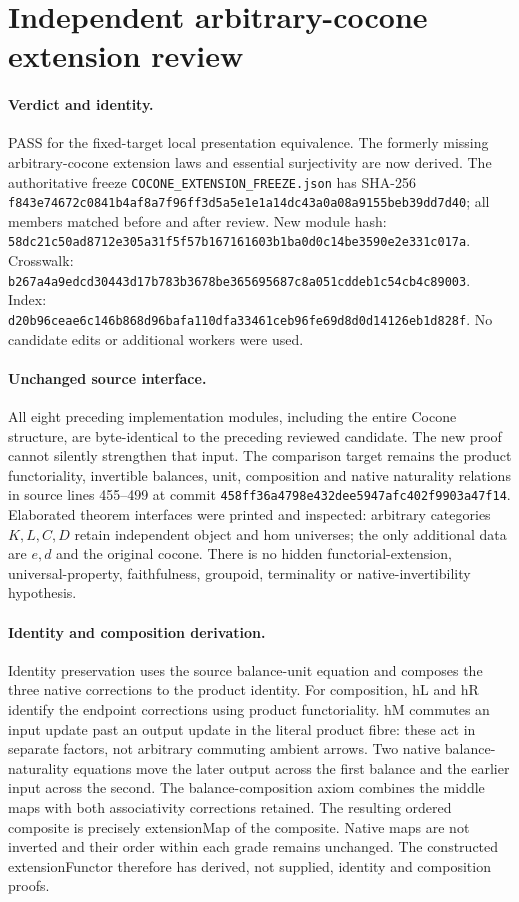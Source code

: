 \documentclass{article}
\begin{document}
\section*{Independent arbitrary-cocone extension review}
\paragraph{Verdict and identity.} PASS for the fixed-target local presentation equivalence. The formerly missing arbitrary-cocone extension laws and essential surjectivity are now derived. The authoritative freeze \texttt{COCONE\_EXTENSION\_FREEZE.json} has SHA-256 \texttt{f843e74672c0841b4af8a7f96ff3d5a5e1e1a14dc43a0a08a9155beb39dd7d40}; all members matched before and after review. New module hash: \texttt{58dc21c50ad8712e305a31f5f57b167161603b1ba0d0c14be3590e2e331c017a}. Crosswalk: \texttt{b267a4a9edcd30443d17b783b3678be365695687c8a051cddeb1c54cb4c89003}. Index: \texttt{d20b96ceae6c146b868d96bafa110dfa33461ceb96fe69d8d0d14126eb1d828f}. No candidate edits or additional workers were used.
\paragraph{Unchanged source interface.} All eight preceding implementation modules, including the entire Cocone structure, are byte-identical to the preceding reviewed candidate. The new proof cannot silently strengthen that input. The comparison target remains the product functoriality, invertible balances, unit, composition and native naturality relations in source lines 455--499 at commit \texttt{458ff36a4798e432dee5947afc402f9903a47f14}. Elaborated theorem interfaces were printed and inspected: arbitrary categories $K,L,C,D$ retain independent object and hom universes; the only additional data are $e,d$ and the original cocone. There is no hidden functorial-extension, universal-property, faithfulness, groupoid, terminality or native-invertibility hypothesis.
\paragraph{Identity and composition derivation.} Identity preservation uses the source balance-unit equation and composes the three native corrections to the product identity. For composition, hL and hR identify the endpoint corrections using product functoriality. hM commutes an input update past an output update in the literal product fibre: these act in separate factors, not arbitrary commuting ambient arrows. Two native balance-naturality equations move the later output across the first balance and the earlier input across the second. The balance-composition axiom combines the middle maps with both associativity corrections retained. The resulting ordered composite is precisely extensionMap of the composite. Native maps are not inverted and their order within each grade remains unchanged. The constructed extensionFunctor therefore has derived, not supplied, identity and composition proofs.
\end{document}
